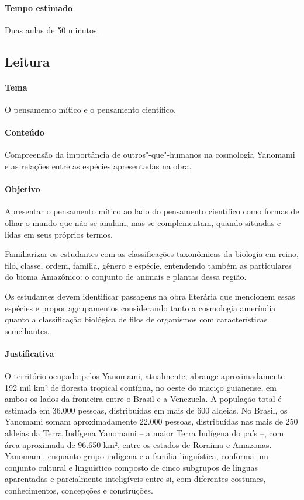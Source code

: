 \documentclass[12pt]{extarticle}
\begin{document}
{

\paragraph{Tempo estimado} Duas aulas de 50 minutos.


\subsection{Leitura}

\paragraph{Tema} O pensamento mítico e o pensamento científico.

\paragraph{Conteúdo} Compreensão da importância de outros"-que"-humanos na cosmologia
Yanomami e as relações entre as espécies apresentadas na obra. 

\paragraph{Objetivo} Apresentar o pensamento mítico ao lado do pensamento científico
como formas de olhar o mundo que não se anulam, mas se complementam, quando situadas e 
lidas em seus próprios termos. 

Familiarizar os estudantes com as classificações taxonômicas da biologia em reino, filo, 
classe, ordem, família, gênero e espécie, entendendo também as particulares do bioma 
Amazônico: o conjunto de animais e plantas dessa região.

Os estudantes devem identificar passagens na obra literária que mencionem essas espécies e
propor agrupamentos considerando tanto a cosmologia ameríndia quanto a classificação biológica
de filos de organismos com características semelhantes. 

\paragraph{Justificativa} O território ocupado pelos Yanomami, atualmente, abrange 
aproximadamente 192 mil km² de floresta tropical contínua, no oeste do maciço 
guianense, em ambos os lados da fronteira entre o Brasil e a Venezuela. A população 
total é estimada em 36.000 pessoas, distribuídas em  mais de 600 aldeias. 
No Brasil, os Yanomami somam aproximadamente 22.000 pessoas, distribuídas 
nas mais de 250 aldeias da Terra Indígena Yanomami – a maior Terra Indígena 
do país –, com área aproximada de 96.650 km², entre os estados de Roraima e 
Amazonas. Yanomami, enquanto grupo indígena e a família linguística, conforma
um conjunto cultural e linguístico composto de cinco subgrupos de línguas 
aparentadas e parcialmente inteligíveis entre si, com diferentes costumes, 
conhecimentos, concepções e construções.

}
\end{document}
